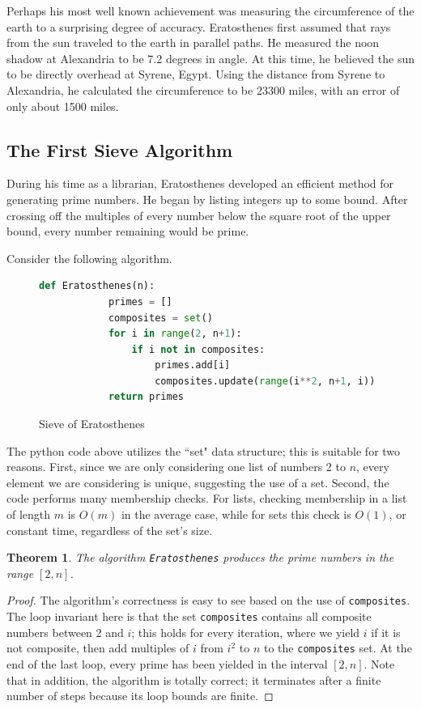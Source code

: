 \documentclass{amsart}
\newtheorem{thm}{Theorem}
\theoremstyle{definition}
\theoremstyle{case}
\begin{document}
	Perhaps his most well known achievement was measuring the circumference of the earth to a surprising degree of accuracy. Eratosthenes first assumed that rays from the sun traveled to the earth in parallel paths. He measured the noon shadow at Alexandria to be 7.2 degrees in angle. At this time, he believed the sun to be directly overhead at Syrene, Egypt. Using the distance from Syrene to Alexandria, he calculated the circumference to be 23300 miles, with an error of only about 1500 miles. 
	
	\subsection{The First Sieve Algorithm}
	
	During his time as a librarian, Eratosthenes developed an efficient method for generating prime numbers. He began by listing integers up to some bound. After crossing off the multiples of every number below the square root of the upper bound, every number remaining would be prime.
	
	Consider the following algorithm.
	
	\begin{figure}[H]\caption{Sieve of Eratosthenes}
		\begin{lstlisting}[language=Python]
		def Eratosthenes(n):
		    primes = []
		    composites = set()
		    for i in range(2, n+1):
		        if i not in composites:
		            primes.add[i]
		            composites.update(range(i**2, n+1, i))
		    return primes
		\end{lstlisting}
	\end{figure}
	
	The python code above utilizes the ``set" data structure; this is suitable for two reasons. First, since we are only considering one list of numbers 2 to $n$, every element we are considering is unique, suggesting the use of a set. Second, the code performs many membership checks. For lists, checking membership in a list of length $m$ is $O(m)$ in the average case, while for sets this check is $O(1)$, or constant time, regardless of the set's size.
	
	\begin{thm}
		The algorithm \texttt{Eratosthenes} produces the prime numbers in the range $[2, n]$.
	\end{thm}
	\begin{proof}
		The algorithm's correctness is easy to see based on the use of \texttt{composites}. The loop invariant here is that the set \texttt{composites} contains all composite numbers between 2 and $i$; this holds for every iteration, where we yield $i$ if it is not composite, then add multiples of $i$ from $i^2$ to $n$ to the \texttt{composites} set. At the end of the last loop, every prime has been yielded in the interval $[2, n]$. Note that in addition, the algorithm is totally correct; it terminates after a finite number of steps because its loop bounds are finite.
	\end{proof}
\end{document}
